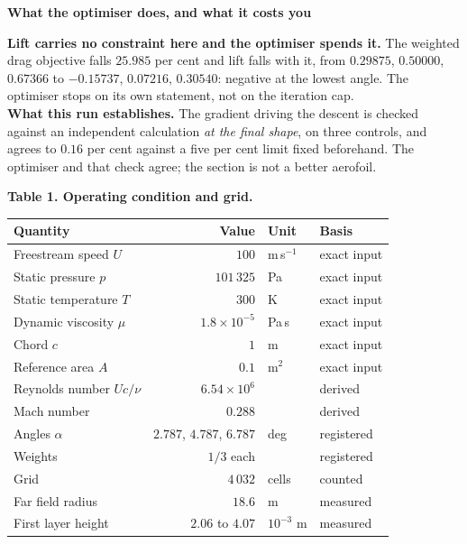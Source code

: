 \documentclass[9pt,a4paper]{article}
\renewcommand{\footnotesize}{\fontsize{6.4}{6.85}\selectfont}
\begin{document}
\vspace{1.5pt}
\begin{minipage}[t]{0.505\textwidth}
\textbf{What the optimiser does, and what it costs you}

\vspace{1pt}
{\footnotesize \textbf{Lift carries no constraint here and the optimiser spends
it.} The weighted drag objective falls $25.985$ per cent and lift falls with
it, from $0.29875$, $0.50000$, $0.67366$ to $\mathbf{-0.15737}$, $0.07216$,
$0.30540$: negative at the lowest angle. The optimiser stops on its own
statement, not on the iteration cap.\\[2pt]
\textbf{What this run establishes.} The gradient driving the descent is checked
against an independent calculation \emph{at the final shape}, on three
controls, and agrees to $0.16$ per cent against a five per cent limit fixed
beforehand. The optimiser and that check agree; the section is not a better
aerofoil.}

\vspace{1.5pt}
\textbf{Table 1. Operating condition and grid.}

\vspace{1.5pt}
{\fontsize{6.7}{7.9}\selectfont
\begin{tabular}{@{}l r l l@{}}
\toprule
Quantity & Value & Unit & Basis \\
\midrule
Freestream speed $U$          & $100$               & m\,s$^{-1}$     & exact input \\
Static pressure $p$           & $101\,325$          & Pa              & exact input \\
Static temperature $T$        & $300$               & K               & exact input \\
Dynamic viscosity $\mu$       & $1.8\times10^{-5}$  & Pa\,s           & exact input \\
Chord $c$                     & $1$                 & m               & exact input \\
Reference area $A$            & $0.1$               & m$^2$           & exact input \\
Reynolds number $Uc/\nu$      & $6.54\times10^{6}$  &                 & derived \\
Mach number                   & $0.288$             &                 & derived \\
Angles $\alpha$               & $2.787$, $4.787$, $6.787$ & deg       & registered \\
Weights                       & $1/3$ each          &                 & registered \\
\midrule
Grid                          & $4\,032$            & cells           & counted \\
Far field radius              & $18.6$              & m               & measured \\
First layer height            & $2.06$ to $4.07$    & $10^{-3}$ m     & measured \\
\bottomrule
\end{tabular}}


\end{minipage}
\end{document}
